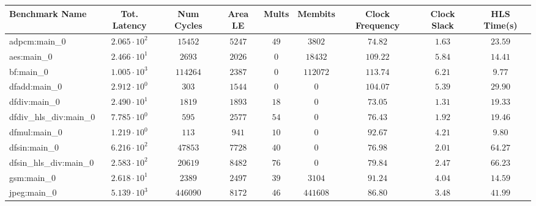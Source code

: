 \begin{tabular}{|l|c|c|c|c|c|c|c|c|}
\hline
Benchmark Name          & Tot. Latency           & Num Cycles & Area LE   & Mults   & Membits    & Clock Frequency & Clock Slack & HLS Time(s) \\
\hline
adpcm:main\_0           & $ 2.065 \cdot 10^{2} $ & $ 15452  $ & $ 5247  $ & $ 49  $ & $ 3802   $ & $ 74.82       $ & $ 1.63    $ & $ 23.59   $ \\
aes:main\_0             & $ 2.466 \cdot 10^{1} $ & $ 2693   $ & $ 2026  $ & $ 0   $ & $ 18432  $ & $ 109.22      $ & $ 5.84    $ & $ 14.41   $ \\
bf:main\_0              & $ 1.005 \cdot 10^{3} $ & $ 114264 $ & $ 2387  $ & $ 0   $ & $ 112072 $ & $ 113.74      $ & $ 6.21    $ & $ 9.77    $ \\
dfadd:main\_0           & $ 2.912 \cdot 10^{0} $ & $ 303    $ & $ 1544  $ & $ 0   $ & $ 0      $ & $ 104.07      $ & $ 5.39    $ & $ 29.90   $ \\
dfdiv:main\_0           & $ 2.490 \cdot 10^{1} $ & $ 1819   $ & $ 1893  $ & $ 18  $ & $ 0      $ & $ 73.05       $ & $ 1.31    $ & $ 19.33   $ \\
dfdiv\_hls\_div:main\_0 & $ 7.785 \cdot 10^{0} $ & $ 595    $ & $ 2577  $ & $ 54  $ & $ 0      $ & $ 76.43       $ & $ 1.92    $ & $ 19.46   $ \\
dfmul:main\_0           & $ 1.219 \cdot 10^{0} $ & $ 113    $ & $ 941   $ & $ 10  $ & $ 0      $ & $ 92.67       $ & $ 4.21    $ & $ 9.80    $ \\
dfsin:main\_0           & $ 6.216 \cdot 10^{2} $ & $ 47853  $ & $ 7728  $ & $ 40  $ & $ 0      $ & $ 76.98       $ & $ 2.01    $ & $ 64.27   $ \\
dfsin\_hls\_div:main\_0 & $ 2.583 \cdot 10^{2} $ & $ 20619  $ & $ 8482  $ & $ 76  $ & $ 0      $ & $ 79.84       $ & $ 2.47    $ & $ 66.23   $ \\
gsm:main\_0             & $ 2.618 \cdot 10^{1} $ & $ 2389   $ & $ 2497  $ & $ 39  $ & $ 3104   $ & $ 91.24       $ & $ 4.04    $ & $ 14.59   $ \\
jpeg:main\_0            & $ 5.139 \cdot 10^{3} $ & $ 446090 $ & $ 8172  $ & $ 46  $ & $ 441608 $ & $ 86.80       $ & $ 3.48    $ & $ 41.99   $ \\

\end{tabular}
